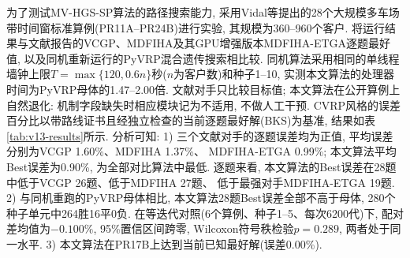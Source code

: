 \documentclass{setp-new}
\begin{document}
为了测试MV-HGS-SP算法的路径搜索能力,
采用Vidal等\cite{ref:74}提出的28个大规模多车场带时间窗标准算例(PR11A--PR24B)进行实验,
其规模为360--960个客户.
将运行结果与文献报告的VCGP\cite{ref:74}、MDFIHA及其GPU增强版本MDFIHA-ETGA\cite{ref:75}逐题最好值,
以及同机重新运行的PyVRP混合遗传搜索\cite{ref:64}相比较.
同机算法采用相同的单线程墙钟上限$T=\max\{120,0.6n\}$秒($n$为客户数)和种子1--10,
实测本文算法的处理器时间为PyVRP母体的1.47--2.00倍.
文献对手只比较目标值;
本文算法在公开算例上自然退化: 机制字段缺失时相应模块记为不适用, 不做人工干预.
CVRP风格的误差百分比以带路线证书且经独立检查的当前逐题最好解(BKS)为基准,
结果如表\ref{tab:v13-results}所示.
分析可知:
1) 三个文献对手的逐题误差均为正值, 平均误差分别为VCGP 1.60\%、MDFIHA 1.37\%、
MDFIHA-ETGA 0.99\%; 本文算法平均Best误差为0.90\%, 为全部对比算法中最低.
逐题来看, 本文算法的Best误差在28题中低于VCGP 26题、低于MDFIHA 27题、
低于最强对手MDFIHA-ETGA 19题.
2) 与同机重跑的PyVRP母体相比, 本文算法28题Best误差全部不高于母体, 280个种子单元中264胜16平0负.
在等迭代对照(6个算例、种子1--5、每次6200代)下, 配对差均值为$-0.100\%$,
95\%置信区间跨零, Wilcoxon符号秩检验$p=0.289$, 两者处于同一水平.
3) 本文算法在PR17B上达到当前已知最好解(误差0.00\%).
\end{document}
